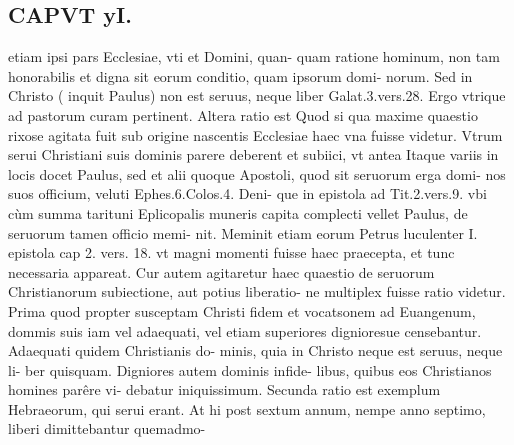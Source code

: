 \documentclass{article}
\begin{document}
\begin{pages}
\section*{CAPVT  yI. }
\marginpar{[ p.411 ]}\pstart etiam ipsi pars Ecclesiae, vti et Domini, quan- quam ratione hominum, non tam honorabilis et digna sit eorum conditio, quam ipsorum domi- norum. Sed in Christo ( inquit Paulus) non est seruus, neque liber Galat.3.vers.28. Ergo vtrique ad pastorum curam pertinent.  \pend\pstart Altera ratio est Quod si qua maxime quaestio rixose agitata fuit sub origine nascentis Ecclesiae haec vna fuisse videtur. Vtrum serui Christiani suis dominis parere deberent et subiici, vt antea Itaque variis in locis docet Paulus, sed et alii quoque Apostoli, quod sit seruorum erga domi- nos suos officium, veluti Ephes.6.Colos.4. Deni- que in epistola ad Tit.2.vers.9. vbi cùm summa tarituni Eplicopalis muneris capita complecti vellet Paulus, de seruorum tamen officio memi- nit. Meminit etiam eorum Petrus luculenter I. epistola cap 2. vers. 18. vt magni momenti fuisse haec praecepta, et tunc necessaria appareat.  \pend\pstart Cur autem agitaretur haec quaestio de seruorum Christianorum subiectione, aut potius liberatio- ne multiplex fuisse ratio videtur.  \pend\pstart Prima quod propter susceptam Christi fidem et vocatsonem ad Euangenum, dommis suis iam vel adaequati, vel etiam superiores dignioresue censebantur. Adaequati quidem Christianis do- minis, quia in Christo neque est seruus, neque li- ber quisquam. Digniores autem dominis infide- libus, quibus eos Christianos homines parêre vi- debatur iniquissimum.  \pend\pstart Secunda ratio est exemplum Hebraeorum, qui serui erant. At hi post sextum annum, nempe anno septimo, liberi dimittebantur quemadmo-  \pend

\end{pages}
\end{document}
